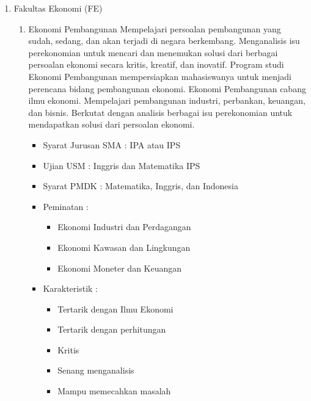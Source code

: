 \documentclass[a4paper,twoside]{article}
\begin{document}
\begin{enumerate}
		\begin{enumerate}
			\item Fakultas Ekonomi (FE)
			\begin{enumerate}
				\item Ekonomi Pembangunan
					Mempelajari persoalan pembangunan yang sudah, sedang, dan akan terjadi di negara berkembang. Menganalisis isu perekonomian untuk mencari dan menemukan solusi dari berbagai persoalan ekonomi secara kritis, kreatif, dan inovatif. Program studi Ekonomi Pembangunan mempersiapkan mahasiswanya untuk menjadi perencana bidang pembangunan ekonomi. Ekonomi Pembangunan cabang ilmu ekonomi. Mempelajari pembangunan industri, perbankan, keuangan, dan bisnis. Berkutat dengan analisis berbagai isu perekonomian untuk mendapatkan solusi dari persoalan ekonomi.

					\begin{itemize}
						\item Syarat Jurusan SMA : IPA atau IPS
						\item Ujian USM : Inggris dan Matematika IPS
						\item Syarat PMDK : Matematika, Inggris, dan Indonesia
						\item Peminatan :
						\begin{itemize}
							\item Ekonomi Industri dan Perdagangan
							\item Ekonomi Kawasan dan Lingkungan
							\item Ekonomi Moneter dan Keuangan
						\end{itemize}
						\item Karakteristik :
						\begin{itemize}
							\item Tertarik dengan Ilmu Ekonomi
							\item Tertarik dengan perhitungan 
							\item Kritis
							\item Senang menganalisis
							\item Mampu memecahkan masalah
						\end{itemize}
					\end{itemize}
					

\end{enumerate}
\end{enumerate}
\end{enumerate}
\end{document}
